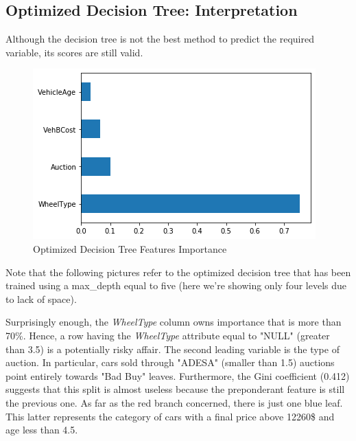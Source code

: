 \documentclass{article}
\begin{document}
	\subsection{Optimized Decision Tree: Interpretation}
	Although the decision tree is not the best method to predict the required variable, its scores are still valid.
	\begin{figure}
		\centering
		\includegraphics[width=.4\textwidth]{dectreevar.png}
		\caption{Optimized Decision Tree Features Importance}
		\label{fig:optdectreefeat}
	\end{figure}
	Note that the following pictures refer to the optimized decision tree that has been trained using a max\_depth equal to five (here we're showing only four levels due to lack of space).
	
	Surprisingly enough, the \emph{WheelType} column owns importance that is more than 70\%. Hence, a row having the \emph{WheelType} attribute equal to "NULL" (greater than 3.5) is a potentially risky affair. The second leading variable is the type of auction. In particular, cars sold through "ADESA" (smaller than 1.5) auctions point entirely towards "Bad Buy" leaves. Furthermore, the Gini coefficient (0.412) suggests that this split is almost useless because the preponderant feature is still the previous one. As far as the red branch concerned, there is just one blue leaf. This latter represents the category of cars with a final price above 12260\$ and age less than 4.5.
	
	
	
\end{document}
